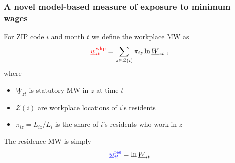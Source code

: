 \documentclass[aspectratio=169, t]{beamer}
\newcommand{\Z}{\mathcal{Z}}
\newcommand{\MW}{\underline{W}}
\newcommand{\mw}{\underline{w}}
\newcommand{\wkp}{\text{wkp}}
\newcommand{\res}{\text{res}}
\begin{document}
\begin{frame}
\frametitle{A novel model-based measure of exposure to minimum wages}

    For ZIP code $i$ and month $t$ we define the {\color{red} workplace MW} as
    $$
    {\color{red} \mw^{\wkp}_{it}} = 
    \sum_{z \in \Z(i)} \pi_{i z} \ln \MW_{zt} \ ,
    $$
    \vspace{-2.5mm}
    where
    \vspace{1mm}
    \begin{itemize} \small
        \item $\MW_{zt}$ is statutory MW in $z$ at time $t$
        \item $\Z(i)$ are workplace locations of $i$'s residents
        \item $\pi_{i z} = L_{i z}/L_i$ is the share of $i$'s residents who work 
        in $z$
    \end{itemize}

    \vspace{3mm}
    The {\color{blue} residence MW} is simply
    $$
    {\color{blue} \mw^{\res}_{it}} = \ln \MW_{it}
    $$
\end{frame}
\end{document}
